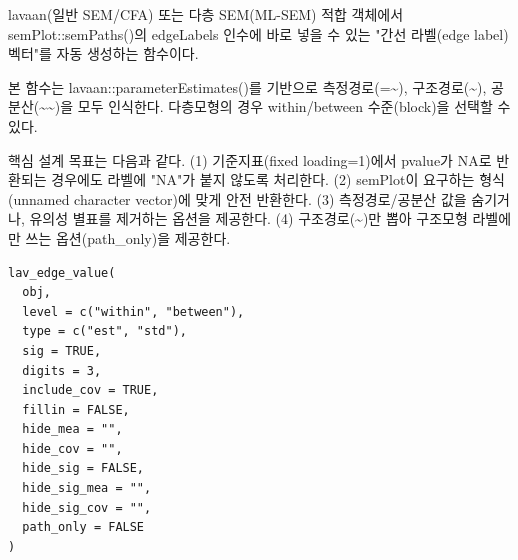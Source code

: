 \documentclass[a4paper]{book}
\begin{document}
%
\begin{Description}
lavaan(일반 SEM/CFA) 또는 다층 SEM(ML-SEM) 적합 객체에서
semPlot::semPaths()의 edgeLabels 인수에 바로 넣을 수 있는
"간선 라벨(edge label) 벡터"를 자동 생성하는 함수이다.

본 함수는 lavaan::parameterEstimates()를 기반으로
측정경로(=\textasciitilde{}), 구조경로(\textasciitilde{}), 공분산(\textasciitilde{}\textasciitilde{})을 모두 인식한다.
다층모형의 경우 within/between 수준(block)을 선택할 수 있다.

핵심 설계 목표는 다음과 같다.
(1) 기준지표(fixed loading=1)에서 pvalue가 NA로 반환되는 경우에도
라벨에 "NA"가 붙지 않도록 처리한다.
(2) semPlot이 요구하는 형식(unnamed character vector)에 맞게 안전 반환한다.
(3) 측정경로/공분산 값을 숨기거나, 유의성 별표를 제거하는 옵션을 제공한다.
(4) 구조경로(\textasciitilde{})만 뽑아 구조모형 라벨에만 쓰는 옵션(path\_only)을 제공한다.
\end{Description}
%
\begin{Usage}
\begin{verbatim}
lav_edge_value(
  obj,
  level = c("within", "between"),
  type = c("est", "std"),
  sig = TRUE,
  digits = 3,
  include_cov = TRUE,
  fillin = FALSE,
  hide_mea = "",
  hide_cov = "",
  hide_sig = FALSE,
  hide_sig_mea = "",
  hide_sig_cov = "",
  path_only = FALSE
)
\end{verbatim}
\end{Usage}
%
\end{document}
